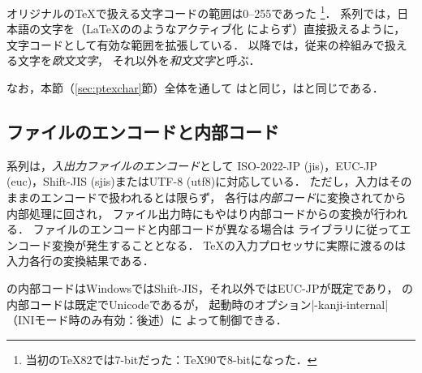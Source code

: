 \documentclass[a4paper,11pt,nomag,dvipdfmx]{jsarticle}
\begin{document}

オリジナルの\TeX で扱える文字コードの範囲は0--255であった
\footnote{当初の\TeX82では7-bitだった：\TeX90で8-bitになった．}．
\pTeX 系列では，日本語の文字を（\LaTeX ののようなアクティブ化
によらず）直接扱えるように，文字コードとして有効な範囲を拡張している．
以降では，従来の枠組みで扱える文字を\emph{欧文文字}，
それ以外を\emph{和文文字}と呼ぶ．

なお，本節（\ref{sec:ptexchar}節）全体を通して
\epTeX は\pTeX と同じ，\eupTeX は\upTeX と同じである．

\subsection{ファイルのエンコードと内部コード}
\pTeX 系列は，\emph{入出力ファイルのエンコード}として
ISO-2022-JP (jis)，EUC-JP (euc)，Shift-JIS (sjis)またはUTF-8 (utf8)に対応している．
ただし，入力はそのままのエンコードで扱われるとは限らず，
各行は\emph{内部コード}に変換されてから内部処理に回され，
ファイル出力時にもやはり内部コードからの変換が行われる．
ファイルのエンコードと内部コードが異なる場合は
ライブラリに従ってエンコード変換が発生することとなる．
\TeX の入力プロセッサに実際に渡るのは入力各行の変換結果である．

\pTeX の内部コードはWindowsではShift-JIS，それ以外ではEUC-JPが既定であり，
\upTeX の内部コードは既定でUnicodeであるが，
起動時のオプション|-kanji-internal|（INIモード時のみ有効：後述）に
よって制御できる．
\end{document}
